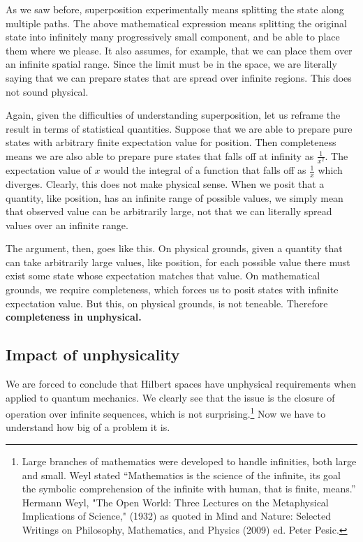 \documentclass[10pt,twocolumn, nofootinbib]{revtex4-2}
\begin{document}
As we saw before, superposition experimentally means splitting the state along multiple paths. The above mathematical expression means splitting the original state into infinitely many progressively small component, and be able to place them where we please. It also assumes, for example, that we can place them over an infinite spatial range. Since the limit must be in the space, we are literally saying that we can prepare states that are spread over infinite regions. This does not sound physical.

Again, given the difficulties of understanding superposition, let us reframe the result in terms of statistical quantities. Suppose that we are able to prepare pure states with arbitrary finite expectation value for position. Then completeness means we are also able to prepare pure states that falls off at infinity as $\frac{1}{x^2}$. The expectation value of $x$ would the integral of a function that falls off as $\frac{1}{x}$ which diverges. Clearly, this does not make physical sense. When we posit that a quantity, like position, has an infinite range of possible values, we simply mean that observed value can be arbitrarily large, not that we can literally spread values over an infinite range. 

The argument, then, goes like this. On physical grounds, given a quantity that can take arbitrarily large values, like position, for each possible value there must exist some state whose expectation matches that value. On mathematical grounds, we require completeness, which forces us to posit states with infinite expectation value. But this, on physical grounds, is not teneable. Therefore \textbf{completeness in unphysical.}

\subsection{Impact of unphysicality}

We are forced to conclude that Hilbert spaces have unphysical requirements when applied to quantum mechanics. We clearly see that the issue is the closure of operation over infinite sequences, which is not surprising.\footnote{Large branches of mathematics were developed to handle infinities, both large and small. Weyl stated ``Mathematics is the science of the infinite, its goal the symbolic comprehension of the infinite with human, that is finite, means.'' Hermann Weyl, "The Open World: Three Lectures on the Metaphysical Implications of Science," (1932) as quoted in Mind and Nature: Selected Writings on Philosophy, Mathematics, and Physics (2009) ed. Peter Pesic.} Now we have to understand how big of a problem it is.
\end{document}
